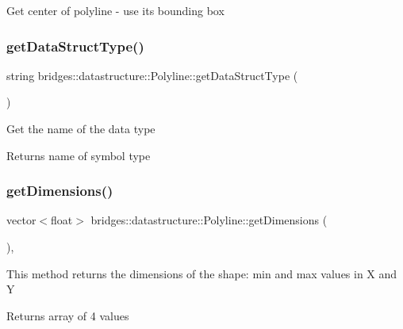 Get center of polyline -\/ use its bounding box \mbox{\label{classbridges_1_1datastructure_1_1_polyline_a49b37ad55cf64fe759ee5a0f46e2e0cc}} 
\subsubsection{\texorpdfstring{get\+Data\+Struct\+Type()}{getDataStructType()}}
{\footnotesize\ttfamily string bridges\+::datastructure\+::\+Polyline\+::get\+Data\+Struct\+Type (\begin{DoxyParamCaption}{ }\end{DoxyParamCaption})\hspace{0.3cm}{\ttfamily [inline]}}

Get the name of the data type \begin{DoxyReturn}{Returns}
name of symbol type 
\end{DoxyReturn}
\mbox{\label{classbridges_1_1datastructure_1_1_polyline_aebcd7f4f80e2eed35057e5b1d82ba4e7}} 
\subsubsection{\texorpdfstring{get\+Dimensions()}{getDimensions()}}
{\footnotesize\ttfamily vector$<$float$>$ bridges\+::datastructure\+::\+Polyline\+::get\+Dimensions (\begin{DoxyParamCaption}{ }\end{DoxyParamCaption})\hspace{0.3cm}{\ttfamily [inline]}, {\ttfamily [virtual]}}

This method returns the dimensions of the shape\+: min and max values in X and Y

\begin{DoxyReturn}{Returns}
array of 4 values 
\end{DoxyReturn}


